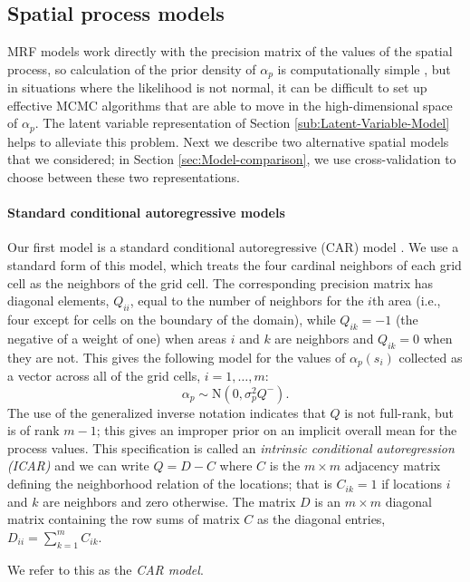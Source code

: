 \documentclass[12pt]{article}
\begin{document}
\subsection{Spatial process models}

MRF models work directly with the precision matrix of the values of
the spatial process, so calculation of the prior density of $\alpha_{p}$
is computationally simple \citep{Rue:Held:2005}, but in situations
where the likelihood is not normal, it can be difficult to set up
effective MCMC algorithms that are able to move in the high-dimensional
space of $\alpha_{p}$. The latent variable representation of Section
\ref{sub:Latent-Variable-Model} helps to alleviate this problem.
Next we describe two alternative spatial models that we considered;
in Section \ref{sec:Model-comparison}, we use cross-validation to
choose between these two representations.


\paragraph{Standard conditional autoregressive models}

Our first model is a standard conditional autoregressive (CAR) model
\citep{Bane:etal:2004}. We use a standard form of this model, which
treats the four cardinal neighbors of each grid cell as the neighbors
of the grid cell. The corresponding precision matrix has diagonal
elements, $Q_{ii}$, equal to the number of neighbors for the $i$th
area (i.e., four except for cells on the boundary of the domain),
while $Q_{ik}=-1$ (the negative of a weight of one) when areas $i$
and $k$ are neighbors and $Q_{ik}=0$ when they are not. This gives
the following model for the values of $\alpha_{p}(s_{i})$ collected
as a vector across all of the grid cells, $i=1,\ldots,m$: 
\[
\alpha_{p}\sim\mbox{N}(0,\sigma_{p}^{2}Q^{-}).
\]
The use of the generalized inverse notation indicates that $Q$ is
not full-rank, but is of rank $m-1$; this gives an improper prior
on an implicit overall mean for the process values. This specification
is called an \textit{intrinsic conditional autoregression (ICAR)}
and we can write $Q=D-C$ where $C$ is the $m\times m$ adjacency
matrix defining the neighborhood relation of the locations; that is
$C{}_{ik}=1$ if locations $i$ and $k$ are neighbors and zero otherwise.
The matrix $D$ is an $m\times m$ diagonal matrix containing the
row sums of matrix $C$ as the diagonal entries, $D{}_{ii}={\displaystyle \sum_{k=1}^{m}C{}_{ik}}.$

We refer to this as the \emph{CAR model}.
\end{document}
